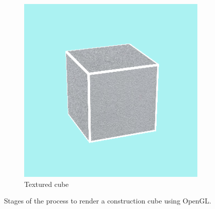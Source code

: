 \begin{figure}[!ht]
	\begin{subfigure}{.32\textwidth}
		\centering
		\includegraphics[width=0.8\linewidth]{figures/cube-render.PNG}
		\caption{Textured cube}
		\label{fig:cube-render}
	\end{subfigure}%
	\caption{Stages of the process to render a construction cube using OpenGL.}
	\label{fig:opengl}
\end{figure}

%
%
%
%
%

